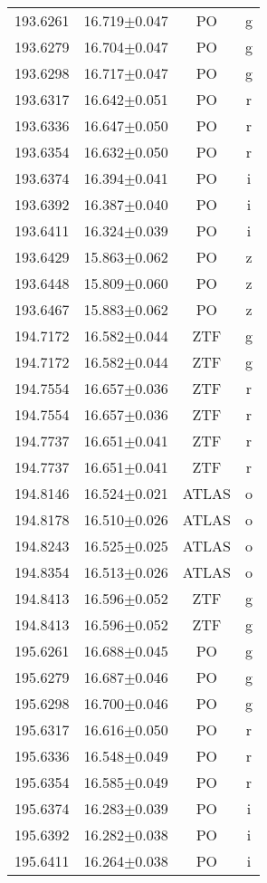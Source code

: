 \begin{table}
\begin{tabular}{cccc}
193.6261 & 16.719$\pm$0.047 & PO & g \\
193.6279 & 16.704$\pm$0.047 & PO & g \\
193.6298 & 16.717$\pm$0.047 & PO & g \\
193.6317 & 16.642$\pm$0.051 & PO & r \\
193.6336 & 16.647$\pm$0.050 & PO & r \\
193.6354 & 16.632$\pm$0.050 & PO & r \\
193.6374 & 16.394$\pm$0.041 & PO & i \\
193.6392 & 16.387$\pm$0.040 & PO & i \\
193.6411 & 16.324$\pm$0.039 & PO & i \\
193.6429 & 15.863$\pm$0.062 & PO & z \\
193.6448 & 15.809$\pm$0.060 & PO & z \\
193.6467 & 15.883$\pm$0.062 & PO & z \\
194.7172 & 16.582$\pm$0.044 & ZTF & g \\
194.7172 & 16.582$\pm$0.044 & ZTF & g \\
194.7554 & 16.657$\pm$0.036 & ZTF & r \\
194.7554 & 16.657$\pm$0.036 & ZTF & r \\
194.7737 & 16.651$\pm$0.041 & ZTF & r \\
194.7737 & 16.651$\pm$0.041 & ZTF & r \\
194.8146 & 16.524$\pm$0.021 & ATLAS & o \\
194.8178 & 16.510$\pm$0.026 & ATLAS & o \\
194.8243 & 16.525$\pm$0.025 & ATLAS & o \\
194.8354 & 16.513$\pm$0.026 & ATLAS & o \\
194.8413 & 16.596$\pm$0.052 & ZTF & g \\
194.8413 & 16.596$\pm$0.052 & ZTF & g \\
195.6261 & 16.688$\pm$0.045 & PO & g \\
195.6279 & 16.687$\pm$0.046 & PO & g \\
195.6298 & 16.700$\pm$0.046 & PO & g \\
195.6317 & 16.616$\pm$0.050 & PO & r \\
195.6336 & 16.548$\pm$0.049 & PO & r \\
195.6354 & 16.585$\pm$0.049 & PO & r \\
195.6374 & 16.283$\pm$0.039 & PO & i \\
195.6392 & 16.282$\pm$0.038 & PO & i \\
195.6411 & 16.264$\pm$0.038 & PO & i \\

\end{tabular}
\end{table}
